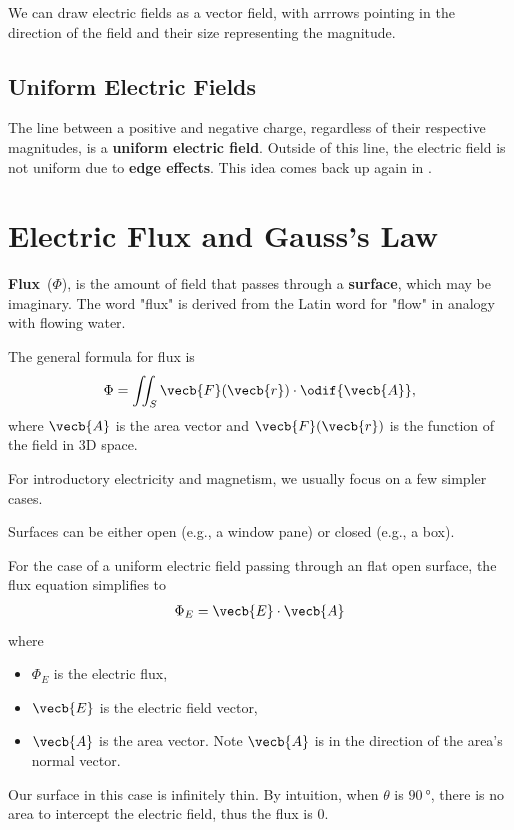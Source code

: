 We can draw electric fields as a vector field,
with arrrows pointing in the direction of the field
and their size representing the magnitude.


\subsection{Uniform Electric Fields}

The line between a positive and negative charge,
regardless of their respective magnitudes,
is a \textbf{uniform electric field}.
Outside of this line,
the electric field is not uniform due to \textbf{edge effects}.
This idea comes back up again in .

\section{Electric Flux and Gauss's Law}

\textbf{Flux}~(\(\Phi\)),
is the amount of field that passes through a \textbf{surface},
which may be imaginary.
The word "flux" is derived from the Latin word for "flow"
in analogy with flowing water.

The general formula for flux is
\begin{equation}
    \Phi = \iint_S \vecb{F}(\vecb{r}) \cdot \odif{\vecb{A}},
\end{equation}
where \(\vecb{A}\) is the area vector
and \(\vecb{F}(\vecb{r})\) is the function of the field in 3D space.

For introductory electricity and magnetism,
we usually focus on a few simpler cases.

Surfaces can be either open (e.g., a window pane) or closed (e.g., a box).

For the case of a uniform electric field passing through an flat open surface,
the flux equation simplifies to
\begin{equation}
    \begin{aligned}
        \Phi_E = \vecb{E} \cdot \vecb{A}
    \end{aligned}
\end{equation}
where
\begin{itemize}
    \item \(\Phi_E\) is the electric flux,
    \item \(\vecb{E}\) is the electric field vector,
    \item \(\vecb{A}\) is the area vector.
        Note \(\vecb{A}\) is in the direction of the area's normal vector.
\end{itemize}
Our surface in this case is infinitely thin.
By intuition, when \(\theta\) is \(\qty{90}{\degree}\),
there is no area to intercept the electric field,
thus the flux is 0.

